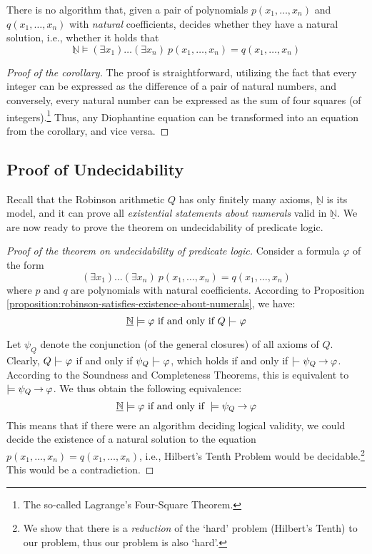     \begin{corollary}
    There is no algorithm that, given a pair of polynomials $p(x_1,\dots,x_n)$ and $q(x_1,\dots,x_n)$ with \emph{natural} coefficients, decides whether they have a natural solution, i.e., whether it holds that
    $$
    \underline{\mathbb N}\models(\exists x_1)\dots(\exists x_n)\ p(x_1,\dots,x_n)=q(x_1,\dots,x_n)
    $$
    \end{corollary}
    \begin{proof}[Proof of the corollary]
    The proof is straightforward, utilizing the fact that every integer can be expressed as the difference of a pair of natural numbers, and conversely, every natural number can be expressed as the sum of four squares (of integers).\footnote{The so-called Lagrange's Four-Square Theorem.} Thus, any Diophantine equation can be transformed into an equation from the corollary, and vice versa.
    \end{proof}
    
    \subsection{Proof of Undecidability}
    
    Recall that the Robinson arithmetic $Q$ has only finitely many axioms, $\underline{\mathbb N}$ is its model, and it can prove all \emph{existential statements about numerals} valid in $\underline{\mathbb N}$. We are now ready to prove the theorem on undecidability of predicate logic.
    
    \begin{proof}[Proof of the theorem on undecidability of predicate logic]
    Consider a formula $\varphi$ of the form 
    $$(\exists x_1)\dots(\exists x_n)\ p(x_1,\dots,x_n)=q(x_1,\dots,x_n)
    $$ 
    where $p$ and $q$ are polynomials with natural coefficients. According to Proposition \ref{proposition:robinson-satisfies-existence-about-numerals}, we have:
    $$
    \underline{\mathbb N}\models \varphi\text{ if and only if }Q\proves \varphi
    $$
    
    Let $\psi_Q$ denote the conjunction (of the general closures) of all axioms of $Q$. Clearly, $Q\proves\varphi$ if and only if $\psi_Q\proves\varphi$, which holds if and only if $\proves\psi_Q\limplies\varphi$. According to the Soundness and Completeness Theorems, this is equivalent to $\models\psi_Q\mathbin{\rightarrow}\varphi$. We thus obtain the following equivalence:
    $$
    \underline{\mathbb N}\models \varphi\text{ if and only if }\models \psi_Q\mathbin{\rightarrow}\varphi
    $$
    This means that if there were an algorithm deciding logical validity, we could decide the existence of a natural solution to the equation $p(x_1,\dots,x_n)=q(x_1,\dots,x_n)$, i.e., Hilbert's Tenth Problem would be decidable.\footnote{We show that there is a \emph{reduction} of the `hard' problem (Hilbert's Tenth) to our problem, thus our problem is also `hard'.} This would be a contradiction.
    \end{proof}
    
